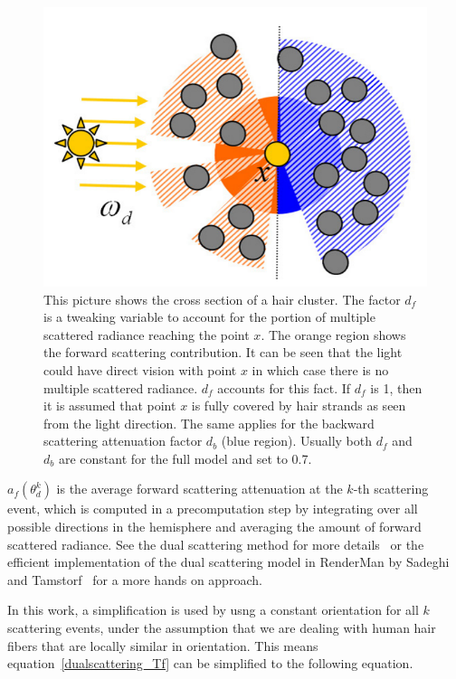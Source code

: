 \begin{figure}[h]
\begin{center}
\includegraphics[scale=0.2]{relatedwork/dualscattering_df.png}
\end{center}
\caption{This picture shows the cross section of a hair cluster. The factor $d_f$ is a tweaking variable to account for the portion of multiple scattered radiance reaching the point $x$. The orange region shows the forward scattering contribution. It can be seen that the light could have direct vision with point $x$ in which case there is no multiple scattered radiance. $d_f$ accounts for this fact. If $d_f$ is 1, then it is assumed that point $x$ is fully covered by hair strands as seen from the light direction. The same applies for the backward scattering attenuation factor $d_b$ (blue region). Usually both $d_f$ and $d_b$ are constant for the full model and set to 0.7.}
\label{fig_df}
\end{figure}


$a_f(\theta_d^k)$ is the average forward scattering attenuation at the $k$-th scattering event, which is computed in a precomputation step by integrating over all possible directions in the hemisphere and averaging the amount of forward scattered radiance. See the dual scattering method for more details~\cite{zinke} or the efficient implementation of the dual scattering model in RenderMan by Sadeghi and Tamstorf~\cite{sadeghi} for a more hands on approach.

In this work, a simplification is used by usng a constant orientation for all $k$ scattering events, under the assumption that we are dealing with human hair fibers that are locally similar in orientation. This means equation~\ref{dualscattering_Tf} can be simplified to the following equation.

